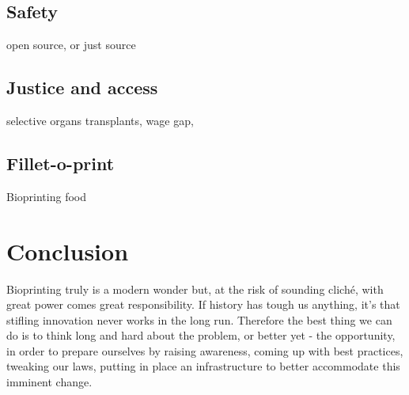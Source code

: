 \documentclass[12pt]{article} %
\begin{document}

\subsection{Safety} %
open source, or just source


\subsection{Justice and access} %
selective organs transplants,
wage gap,


\subsection{Fillet-o-print} %
Bioprinting food
\newpage 


\section{Conclusion} %

Bioprinting truly is a modern wonder but, at the risk of sounding cliché, with great power comes great responsibility. If history has tough us anything, it's that stifling innovation never works in the long run. Therefore the best thing we can do is to think long and hard about the problem, or better yet - the opportunity, in order to prepare ourselves by raising awareness, coming up with best practices, tweaking our laws, putting in place an infrastructure to better accommodate this imminent change.

\newpage

\end{document}
